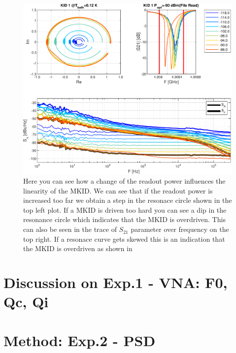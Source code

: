 		
\begin{figure}[h!!!!!!]
	\centering
	\includegraphics[width=.80\linewidth]{figures/ch5_measurement/KID1_0.12K_NOISE_Pdep2SietseCustom3.pdf}
	\caption{Here you can see how a change of the readout power influences the linearity of the MKID. We can see that if the readout power is increased too far we obtain a step in the resonace circle shown in the top left plot. If a MKID is driven too hard you can see a dip in the resonance circle which indicates that the MKID is overdriven. This can also be seen in the trace of $S_{21}$ parameter over frequency on the top right. If a resonace curve gets skewed this is an indication that the MKID is overdriven as shown in \cite{devisserReadoutpowerHeatingHysteretic2010} }
	\label{fig:}
\end{figure}




\section{Discussion on Exp.1 - VNA: F0, Qc, Qi}
\section{Method: Exp.2 - PSD}



